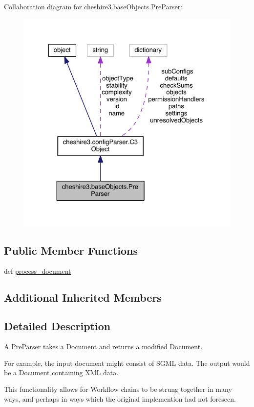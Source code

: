 Collaboration diagram for cheshire3.\-base\-Objects.\-Pre\-Parser\-:
\nopagebreak
\begin{figure}[H]
\begin{center}
\leavevmode
\includegraphics[width=325pt]{classcheshire3_1_1base_objects_1_1_pre_parser__coll__graph}
\end{center}
\end{figure}
\subsection*{Public Member Functions}
\begin{DoxyCompactItemize}
\item 
def \hyperlink{classcheshire3_1_1base_objects_1_1_pre_parser_a7810644f7309ae69c55b0c56618f7d3a}{process\-\_\-document}
\end{DoxyCompactItemize}
\subsection*{Additional Inherited Members}


\subsection{Detailed Description}
\begin{DoxyVerb}A PreParser takes a Document and returns a modified Document.

For example, the input document might consist of SGML data. The
output would be a Document containing XML data.

This functionality allows for Workflow chains to be strung together in 
many ways, and perhaps in ways which the original implemention had not 
foreseen.
\end{DoxyVerb}
 

